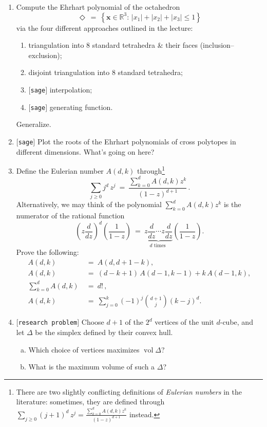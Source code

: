 \documentclass[11pt]{article}
\def\bx{\mathbf{x}}
\def\RR{\mathbb{R}}
\def\open{$[${\tt research problem}$]$ }
\def\sage{$[${\tt sage}$]$ }
\begin{document}
\begin{enumerate}[(1)]
\item Compute the Ehrhart polynomial of the octahedron
\[
  \Diamond \ = \ \left\{ \bx \in \RR^3 : \, \left| x_1 \right| + \left| x_2 \right| + \left| x_3 \right| \leq 1 \right\}
\]
via the four different approaches outlined in the lecture:
\begin{enumerate}
  \item triangulation into 8 standard tetrahedra \& their faces
(inclusion--exclusion);
  \item disjoint triangulation into 8 standard tetrahedra;
  \item \sage interpolation;
  \item \sage generating function.
\end{enumerate}
Generalize.

\item \sage Plot the roots of the Ehrhart polynomials of cross polytopes in
different dimensions. What's going on here?

\newcommand\eulerco[2]{A \left( #1, #2 \right)} 
\item 
Define the Eulerian number
$\eulerco d k$ through\footnote{There are two slightly conflicting definitions of \emph{Eulerian numbers} in the literature: sometimes, they are defined through
$\sum_{ j \ge 0 } (j+1)^d \, z^j = \frac{ \sum_{ k=0 }^{ d } \eulerco d k z^{k}
}{ (1-z)^{ d+1 } }$ instead.}
\begin{equation*}
 \sum_{ j \ge 0 } j^d \, z^j \ = \ \frac{ \sum_{ k=0 }^{ d } \eulerco d k z^{k} }{ (1-z)^{ d+1 } } \, .
\end{equation*}
Alternatively, we may think of the polynomial $ \sum_{ k=0 }^{ d } \eulerco d k z^{k} $ is the numerator of the rational function
\[
 \left( z \frac{ d }{ dz } \right)^d \left( \frac{ 1 }{ 1-z } \right) \ = \ \underbrace{ z \frac{ d }{ dz } \cdots z \frac{ d }{ dz } }_{ d \text{ times } } \left( \frac{ 1 }{ 1-z } \right) .
\]
Prove the following:
\begin{align*}
\eulerco d k \ &= \ \eulerco d {d+1-k} ,  \\
\eulerco{ d }{ k } \ &= \ (d-k+1) \, \eulerco{ d-1 }{ k-1 } + k \, \eulerco{ d-1}{ k } , \\
\sum_{ k=0 }^{ d } \eulerco d k \ &= \ d! \, , \\
\eulerco d k \ &= \ \sum_{ j=0 }^{ k } (-1)^j \binom{ d+1 }{ j } (k-j)^d . 
\end{align*}

\newcommand\vol{\operatorname{vol}} 

\item \open
Choose $d+1$ of the $2^d$ vertices of the unit $d$-cube, and let $\Delta$ be the simplex defined by their convex hull.
\begin{enumerate}[(a)]
\item Which choice of vertices maximizes $\vol \Delta$?
\item What is the maximum volume of such a $\Delta$?
\end{enumerate}


\end{enumerate}
\end{document}
